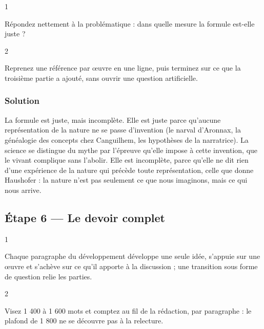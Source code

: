 \documentclass[11pt,a4paper]{article}
\begin{document}
\begin{indication}{1}

Répondez nettement à la problématique : dans quelle mesure la formule est-elle juste ?

\end{indication}

\begin{indication}{2}

Reprenez une référence par œuvre en une ligne, puis terminez sur ce que la troisième partie a ajouté, sans ouvrir une question artificielle.

\end{indication}

\hypertarget{solution-8}{%
\subsubsection{Solution}\label{solution-8}}

La formule est juste, mais incomplète. Elle est juste parce qu'aucune représentation de la nature ne se passe d'invention (le narval d'Aronnax, la généalogie des concepts chez Canguilhem, les hypothèses de la narratrice). La science se distingue du mythe par l'épreuve qu'elle impose à cette invention, que le vivant complique sans l'abolir. Elle est incomplète, parce qu'elle ne dit rien d'une expérience de la nature qui précède toute représentation, celle que donne Haushofer : la nature n'est pas seulement ce que nous imaginons, mais ce qui nous arrive.

\hypertarget{uxe9tape-6-le-devoir-complet}{%
\subsection{Étape 6 --- Le devoir complet}\label{uxe9tape-6-le-devoir-complet}}

\begin{indication}{1}

Chaque paragraphe du développement développe une seule idée, s'appuie sur une œuvre et s'achève sur ce qu'il apporte à la discussion ; une transition sous forme de question relie les parties.

\end{indication}

\begin{indication}{2}

Visez 1 400 à 1 600 mots et comptez au fil de la rédaction, par paragraphe : le plafond de 1 800 ne se découvre pas à la relecture.

\end{indication}
\end{document}
